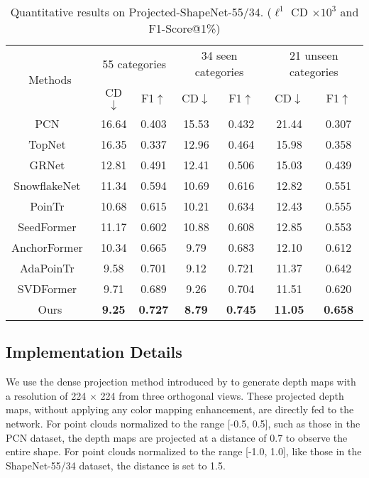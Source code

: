 \begin{table*}[htb]
    \renewcommand\arraystretch{1.1}
    \centering
    \caption{Quantitative results on Projected-ShapeNet-55/34. ({$\displaystyle \ell ^{1}$} CD $\times 10^3$ and F1-Score@1\%)}
    \small
    \label{tab:projectshapenet}
    \begin{tabular}{|c|cc|cc|cc|}
    \hline
    \multirow{2}{*}{Methods} &  \multicolumn{2}{c|}{55 categories} & \multicolumn{2}{c|}{34 seen categories} & \multicolumn{2}{c|}{21 unseen categories} \\ \cline{2-7} & CD$\downarrow$ & F1$\uparrow$ & CD$\downarrow$ & F1$\uparrow$ & CD$\downarrow$ & F1$\uparrow$  \\
    \hline
    PCN~\citep{yuan2018pcn} & 16.64 & 0.403 & 15.53 & 0.432 & 21.44 & 0.307\\
    TopNet~\citep{yuan2018pcn} & 16.35 & 0.337 & 12.96 & 0.464 & 15.98 & 0.358\\
    GRNet~\citep{xie2020grnet} & 12.81 & 0.491 & 12.41 & 0.506 & 15.03 & 0.439\\
    SnowflakeNet~\citep{9928787} & 11.34 & 0.594 & 10.69 & 0.616 & 12.82 & 0.551\\
    PoinTr~\citep{yu2021pointr} & 10.68 & 0.615 & 10.21 & 0.634 & 12.43 & 0.555\\
    SeedFormer~\citep{zhou2022seedformer} & 11.17 & 0.602 & 10.88 & 0.608 & 12.85 & 0.553\\
    AnchorFormer~\citep{chen2023anchorformer} & 10.34 & 0.665 & 9.79 & 0.683 & 12.10 & 0.612\\
    AdaPoinTr~\citep{10232862} & 9.58 & 0.701 & 9.12 & 0.721 & 11.37 & 0.642\\
    SVDFormer~\citep{Zhu_2023_ICCV} & 9.71 & 0.689 & 9.26 & 0.704 & 11.51 & 0.620\\
    
    \hline
    Ours &  \textbf{9.25} & \textbf{0.727} & \textbf{8.79} & \textbf{0.745} & \textbf{11.05} & \textbf{0.658} \\
    \hline
    \end{tabular}
\end{table*}

\subsection{Implementation Details}
We use the dense projection method introduced by \cite{PointCLIPV2} to generate depth maps with a resolution of 224 $\times$ 224 from three orthogonal views. These projected depth maps, without applying any color mapping enhancement, are directly fed to the network. 
For point clouds normalized to the range [-0.5, 0.5], such as those in the PCN dataset, the depth maps are projected at a distance of 0.7 to observe the entire shape. For point clouds normalized to the range [-1.0, 1.0], like those in the ShapeNet-55/34 dataset, the distance is set to 1.5.

